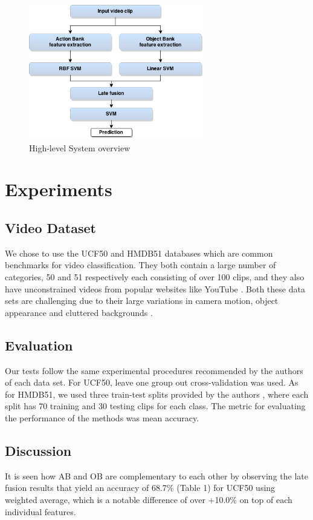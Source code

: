 \documentclass[MIRU]{miru2015e}
\begin{document}
\begin{figure}
\centering
\includegraphics[width=3in]{overview.png}
\caption{High-level System overview}
\label{overview}
\end{figure}

\section{Experiments}

\subsection{Video Dataset}
We chose to use the UCF50 and HMDB51 databases which are common benchmarks for video classification. They both contain a large number of categories, 50 and 51 respectively each consisting of over 100 clips, and they also have unconstrained videos from popular websites like YouTube \cite{hmdb}. Both these data sets are challenging due to their large variations in camera motion, object appearance and cluttered backgrounds \cite{ucf50}. 

\subsection{Evaluation}
Our tests follow the same experimental procedures recommended by the authors of each data set. For UCF50, leave one group out cross-validation \cite{ucf50} was used. As for HMDB51, we used three train-test splits provided by the authors \cite{hmdb}, where each split has 70 training and 30 testing clips for each class. The metric for evaluating the performance of the methods was mean accuracy.

\subsection{Discussion}
It is seen how AB and OB are complementary to each other by observing the late fusion results that yield an accuracy of 68.7\% (Table 1) for UCF50 using weighted average, which is a notable difference of over +10.0\% on top of each individual features. 
\end{document}
